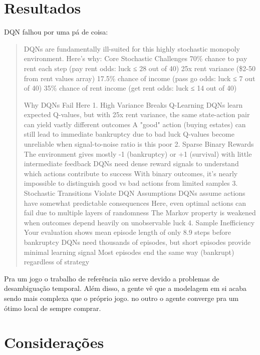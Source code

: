 \documentclass[conference]{IEEEtran}
\begin{document}
\section{Resultados}
\label{results}
DQN falhou por uma pá de coisa:

\begin{quote}
    \small
    \color{blue}
    DQNs are fundamentally ill-suited for this highly stochastic monopoly environment. Here's why:
    Core Stochastic Challenges
    70\% chance to pay rent each step (pay rent odds: luck ≤ 28 out of 40)
    25x rent variance (\$2-50 from rent values array)
    17.5\% chance of income (pass go odds: luck ≤ 7 out of 40)
    35\% chance of rent income (get rent odds: luck ≤ 14 out of 40)

    Why DQNs Fail Here
    1. High Variance Breaks Q-Learning
    DQNs learn expected Q-values, but with 25x rent variance, the same state-action pair can yield vastly different outcomes
    A "good" action (buying estates) can still lead to immediate bankruptcy due to bad luck
    Q-values become unreliable when signal-to-noise ratio is this poor
    2. Sparse Binary Rewards
    The environment gives mostly -1 (bankruptcy) or +1 (survival) with little intermediate feedback
    DQNs need dense reward signals to understand which actions contribute to success
    With binary outcomes, it's nearly impossible to distinguish good vs bad actions from limited samples
    3. Stochastic Transitions Violate DQN Assumptions
    DQNs assume actions have somewhat predictable consequences
    Here, even optimal actions can fail due to multiple layers of randomness
    The Markov property is weakened when outcomes depend heavily on unobservable luck
    4. Sample Inefficiency
    Your evaluation shows mean episode length of only 8.9 steps before bankruptcy
    DQNs need thousands of episodes, but short episodes provide minimal learning signal
    Most episodes end the same way (bankrupt) regardless of strategy

\end{quote}

Pra um jogo o trabalho de referência não serve devido a problemas de desambiguação temporal. Além disso, a gente vê que a modelagem em si acaba sendo mais complexa que o próprio jogo. no outro o agente converge pra um ótimo local de sempre comprar.

\section{Considerações}
\end{document}
